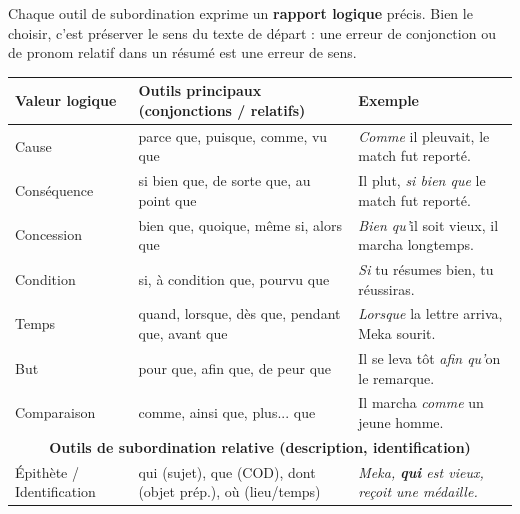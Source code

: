 \documentclass[11pt]{article}
\begin{document}
Chaque outil de subordination exprime un \textbf{rapport logique} précis. Bien le choisir, c'est préserver le sens du texte de départ : une erreur de conjonction ou de pronom relatif dans un résumé est une erreur de sens.

\begin{center}
\begin{tabularx}{\linewidth}{|l|X|X|}
\hline
\rowcolor{popblue!40} \textbf{Valeur logique} & \textbf{Outils principaux (conjonctions / relatifs)} & \textbf{Exemple} \\
\hline
Cause & parce que, puisque, comme, vu que & \emph{Comme} il pleuvait, le match fut reporté. \\
\hline
Conséquence & si bien que, de sorte que, au point que & Il plut, \emph{si bien que} le match fut reporté. \\
\hline
Concession & bien que, quoique, même si, alors que & \emph{Bien qu'}il soit vieux, il marcha longtemps. \\
\hline
Condition & si, à condition que, pourvu que & \emph{Si} tu résumes bien, tu réussiras. \\
\hline
Temps & quand, lorsque, dès que, pendant que, avant que & \emph{Lorsque} la lettre arriva, Meka sourit. \\
\hline
But & pour que, afin que, de peur que & Il se leva tôt \emph{afin qu'}on le remarque. \\
\hline
Comparaison & comme, ainsi que, plus... que & Il marcha \emph{comme} un jeune homme. \\
\hline
\multicolumn{3}{|c|}{\textbf{Outils de subordination relative (description, identification)}} \\
\hline
Épithète / Identification & qui (sujet), que (COD), dont (objet prép.), où (lieu/temps) & \emph{Meka, \textbf{qui} est vieux, reçoit une médaille.} \\
\hline
\end{tabularx}
\end{center}
\end{document}
